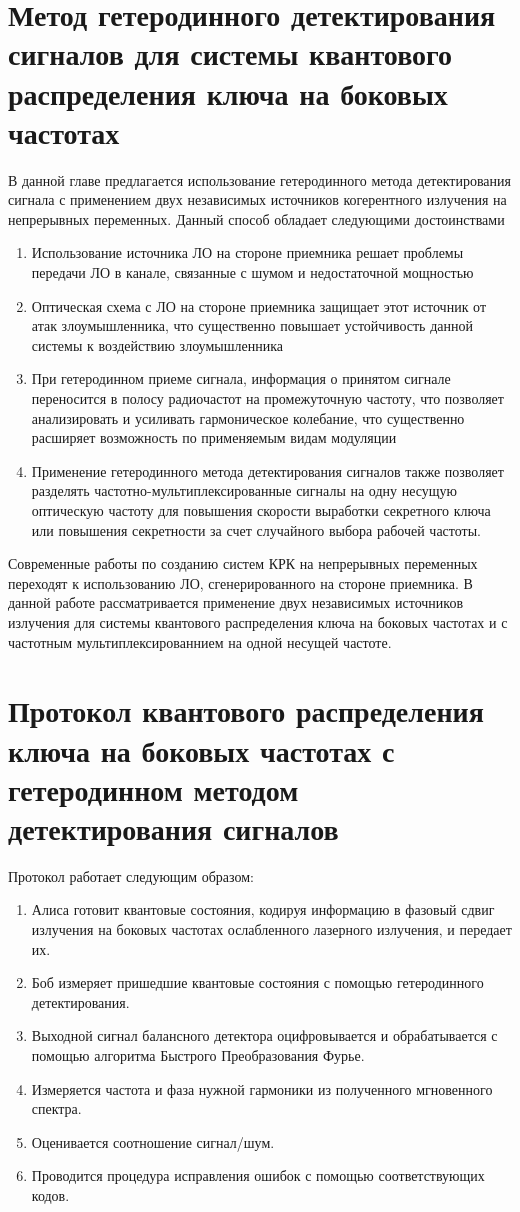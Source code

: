 \section{Метод гетеродинного детектирования сигналов для системы квантового распределения ключа на боковых частотах}\label{sec:ch3/sec1} 
В данной главе предлагается использование гетеродинного метода детектирования сигнала с применением двух независимых источников когерентного излучения на непрерывных переменных. Данный способ обладает следующими достоинствами
\begin{enumerate}
    \item Использование источника ЛО на стороне приемника решает проблемы передачи ЛО в канале, связанные с шумом и недостаточной мощностью
    \item Оптическая схема с ЛО на стороне приемника защищает этот источник от атак злоумышленника, что существенно повышает устойчивость данной системы к воздействию злоумышленника
    \item При гетеродинном приеме сигнала, информация о принятом сигнале переносится в полосу радиочастот на промежуточную частоту, что позволяет анализировать и усиливать гармоническое колебание, что существенно расширяет возможность по применяемым видам модуляции
    \item Применение гетеродинного метода детектирования сигналов также позволяет разделять частотно-мультиплексированные сигналы на одну несущую оптическую частоту для повышения скорости выработки секретного ключа или повышения секретности за счет случайного выбора рабочей частоты.
\end{enumerate}
Современные работы по созданию систем КРК на непрерывных переменных переходят к использованию ЛО, сгенерированного на стороне приемника. В данной работе рассматривается применение двух независимых источников излучения для системы квантового распределения ключа на боковых частотах и с частотным мультиплексированнием на одной несущей частоте.
\section{Протокол квантового распределения ключа на боковых частотах с гетеродинном методом детектирования сигналов}\label{sec:ch3/sect2}
Протокол работает следующим образом:
\begin{enumerate}
    \item Алиса готовит квантовые состояния, кодируя информацию в фазовый сдвиг излучения на боковых частотах ослабленного лазерного излучения, и передает их.
    \item Боб измеряет пришедшие квантовые состояния с помощью гетеродинного детектирования.
    \item Выходной сигнал балансного детектора оцифровывается и обрабатывается с помощью алгоритма Быстрого Преобразования Фурье.
    \item Измеряется частота и фаза нужной гармоники из полученного мгновенного спектра.
    \item Оценивается соотношение сигнал/шум.
    \item Проводится процедура исправления ошибок с помощью соответствующих кодов.
\end{enumerate}
